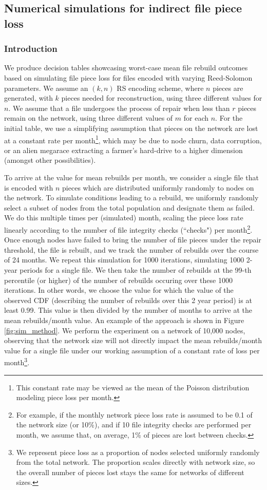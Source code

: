 
\subsection{Numerical simulations for indirect file piece loss}
\subsubsection{Introduction}
We produce decision tables showcasing worst-case mean file rebuild outcomes based on simulating file piece loss for files encoded with varying Reed-Solomon parameters. 
We assume an $(k,n)$ RS encoding scheme, where $n$ pieces are generated, with 
$k$ pieces needed for reconstruction, using three different values for $n$.
We assume that a file undergoes the process of repair when less than $r$ pieces remain on the network, using three different values of $m$ for each $n$.
For the initial table, we use a simplifying assumption that pieces on the network are lost at a constant rate per month\footnote{This constant rate may be viewed as the mean of the Poisson distribution modeling piece loss per month.}, which may be due to node churn, data corruption, or an alien megarace extracting a farmer's hard-drive to a higher dimension (amongst other possibilities).


To arrive at the value for mean rebuilds per month, we consider a single file that is encoded with $n$ pieces which are distributed uniformly randomly to nodes on the network. To simulate conditions leading to a rebuild, we uniformly randomly select a subset of nodes from the total population and designate them as failed. We do this multiple times per (simulated) month, scaling the piece loss rate linearly according to the number of file integrity checks (``checks") per month\footnote{
For example, if the monthly network piece loss rate is assumed to be 0.1 of the network size (or 10\%), and if 10 file integrity checks are performed per month, we assume that, on average, 1\% of pieces are lost between checks.}. 
Once enough nodes have failed to bring the number of file pieces under the repair threshold, the file is rebuilt, and we track the number of rebuilds over the course of 24 months.
We repeat this simulation for 1000 iterations, simulating 1000 2-year periods for a single file. We then take the number of rebuilds at the 99-th percentile (or higher) of the number of rebuilds occuring over these 1000 iterations. In other words, we choose the value for which the value of the observed CDF (describing the number of rebuilds over this 2 year period) is at least 0.99. This value is then divided by the number of months to arrive at the mean rebuilds/month value. An example of the approach is shown in Figure \ref{fig:sim_method}. We perform the experiment on a network of 10,000 nodes, observing that the network size will not directly impact the mean rebuilds/month value for a single file under our working assumption of a constant rate of loss per month\footnote{We represent piece loss as a proportion of nodes selected uniformly randomly from the total network. The proportion scales directly with network size, so the overall number of pieces lost stays the same for networks of different sizes.}.

